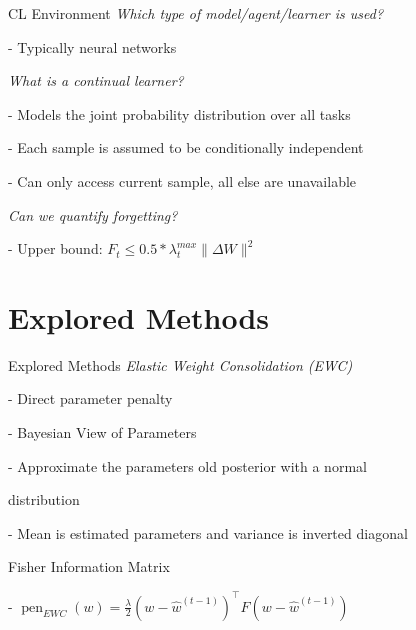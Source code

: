 \documentclass{beamer}
\DeclareMathOperator{\pen}{pen}
\begin{document}
\begin{frame}[t]{CL Environment}
	\textit{Which type of model/agent/learner is used?}
	
	\vspace{0.25cm}
	\quad - Typically neural networks
	
	\vspace{0.5cm}
	\textit{What is a continual learner? \cite{LW}}
	
	\vspace{0.25cm}
	\quad - Models the joint probability distribution over all tasks
	
	\quad - Each sample is assumed to be conditionally independent
	
	\quad - Can only access current sample, all else are unavailable
	
	\vspace{0.5cm}
	\textit{Can we quantify forgetting?}
	
	\vspace{0.25cm}
	\quad - Upper bound: $F_t \leq 0.5 * \lambda^{max}_t\lVert \Delta W \rVert ^2$ \cite{mirzadeh2020understandingroletrainingregimes}
	
\end{frame}

\section{Explored Methods}
\begin{frame}[t]{Explored Methods}
	\textit{Elastic Weight Consolidation (EWC)\cite{JK}} 
	
	\vspace{0.25cm}	
	\quad - Direct parameter penalty
	
	\vspace{0.25cm}	
	\quad - Bayesian View of Parameters 
	
	\vspace{0.25cm}
	\quad - Approximate the parameters old posterior with a normal 
	
	\quad distribution
	
	\vspace{0.25cm}
	\quad - Mean is estimated parameters and variance is inverted diagonal 
	
	\quad Fisher Information Matrix
	
	\vspace{0.25cm}
	\quad - $\pen_{EWC}(w) = \frac{\lambda}{2}(w-\hat{w}^{(t-1)})^\top F (w-\hat{w}^{(t-1)})$

\end{frame}
\end{document}

